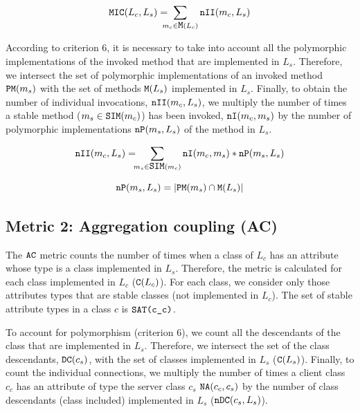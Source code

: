 \documentclass[a4paper]{article}
\begin{document}
\begin{equation*}
\verb|MIC|(L_c, L_s) =\!\!\!\!\! \sum_{m_c \in \verb|M|(L_c)} \verb|nII|(m_c, L_s)
\end{equation*}

According to criterion 6, it is necessary to take into account all the polymorphic implementations of the invoked method that are implemented in $L_s$. Therefore, we intersect the set of polymorphic implementations of an invoked method $\verb|PM|(m_s)$ with the set of methods $\verb|M|(L_s)$ implemented in $L_s$. Finally, to obtain the number of individual invocations, $\verb|nII|(m_c,L_s)$, we multiply the number of times a stable method ($m_s \in \verb|SIM|(m_c)$) has been invoked, $\verb|nI|(m_c, m_s)$ by the number of polymorphic implementations $\verb|nP|(m_s, L_s)$ of the method in $L_s$.

\begin{equation*}
   \verb|nII|(m_c, L_s) =\!\!\! \sum_{m_s \in \verb|SIM|(m_c)} \verb|nI|(m_c, m_s)*\verb|nP|(m_s, L_s)
\end{equation*}

\begin{equation*}
    \verb|nP|(m_s, L_s) = |\verb|PM|(m_s) \cap \verb|M|(L_s)|
\end{equation*}

\subsection{Metric 2: Aggregation coupling (AC)}
The $\verb|AC|$ metric counts the number of times when a class of $L_c$ has an attribute whose type is a class implemented in $L_s$. Therefore, the metric is calculated for each class implemented in $L_c$ ($\verb|C|(L_c)$). For each class, we consider only those attributes types that are stable classes (not implemented in $L_c$). The set of stable attribute types in a class $c$ %
is $\verb|SAT(c_c)|$.

To account for polymorphism (criterion 6), we count all the descendants of the class that are implemented in $L_s$. Therefore, we intersect the set %
of the class descendants, $\verb|DC|(c_s)$, with the set of
classes implemented in $L_s$ ($\verb|C|(L_s)$). Finally, to count the  individual connections, we multiply the number of times a client class $c_c$ has an attribute of type the server class $c_s$ $\verb|NA|(c_c, c_s)$ by the number of class descendants (class included) implemented in $L_s$ ($\verb|nDC|(c_s,L_s)$).
\end{document}
